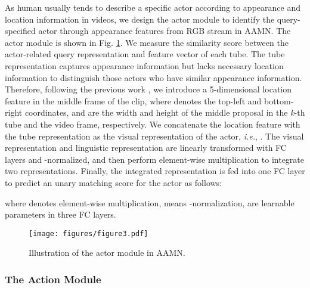 \documentclass[journal]{IEEEtran}
\begin{document}
As human usually tends to describe a specific actor according to appearance and location information in videos, we design the actor module to identify the query-specified actor through appearance features from  RGB stream in AAMN. The actor module is shown in Fig. \ref{fig:actor module}. We measure the similarity score between the actor-related query representation  and feature vector  of each tube. The tube representation captures appearance information but lacks necessary location information to distinguish those actors who have similar appearance information. Therefore, following the previous work \cite{yu2016modeling}, we introduce a 5-dimensional location feature  in the middle frame of the clip, where  denotes the top-left and bottom-right coordinates,  and  are the width and height of the middle proposal in the \emph{k}-th tube and the video frame, respectively. We concatenate the location feature  with the tube representation  as the visual representation of the actor, \emph{i.e.}, . The visual representation  and linguistic representation  are linearly transformed with FC layers and -normalized, and then perform element-wise multiplication to integrate two representations. Finally, the integrated representation is fed into one FC layer to predict an unary matching score for the actor as follows:

where  denotes element-wise multiplication,  means -normalization,  are learnable parameters in three FC layers.



\begin{figure}
\centering
\texttt{[image: figures/figure3.pdf]}
\caption{Illustration of the actor module in AAMN.}
\label{fig:actor module}
\vspace{-0.4cm}
\end{figure}

\subsubsection{The Action Module}
\label{section: action_module}
\end{document}

